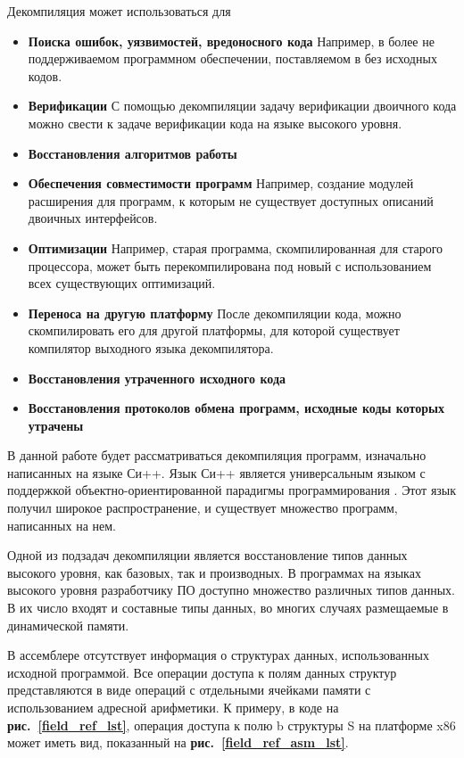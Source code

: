 \documentclass[a4paper,12pt,russian]{article}
\newcommand{\picref}[1]{\textbf{рис.~\ref{#1}}}
\newcommand{\code}[1]{\textsf{#1}}
\begin{document}
Декомпиляция может использоваться для
\begin{itemize}
\item{\textbf{Поиска ошибок, уязвимостей, вредоносного кода}} Например, в более не поддерживаемом программном обеспечении, поставляемом в без исходных кодов.
\item{\textbf{Верификации}} С помощью декомпиляции задачу верификации двоичного кода можно свести к задаче верификации кода на языке высокого уровня.
\item{\textbf{Восстановления алгоритмов работы}}
\item{\textbf{Обеспечения совместимости программ}} Например, создание модулей расширения для программ, к которым не существует доступных описаний двоичных интерфейсов.
\item{\textbf{Оптимизации}} Например, старая программа, скомпилированная для старого процессора, может быть перекомпилирована под новый с использованием всех существующих оптимизаций.
\item{\textbf{Переноса на другую платформу}} После декомпиляции кода, можно скомпилировать его для другой платформы, для которой существует компилятор выходного языка декомпилятора.
\item{\textbf{Восстановления утраченного исходного кода}}
\item{\textbf{Восстановления протоколов обмена программ, исходные коды которых утрачены}}
\end{itemize}

В данной работе будет рассматриваться декомпиляция программ, изначально написанных на языке Си++.
Язык Си++ является универсальным языком с поддержкой объектно-ориентированной парадигмы программирования \cite{strstr}. Этот язык получил широкое распространение, и существует множество программ, написанных на нем.

Одной из подзадач декомпиляции является восстановление типов данных высокого уровня, как базовых, так и производных.
В программах на языках высокого уровня разработчику ПО доступно множество различных типов данных.
В их число входят и составные типы данных, во многих случаях размещаемые в динамической памяти.

В ассемблере отсутствует информация о структурах данных, использованных исходной программой.
Все операции доступа к полям данных структур представляются в виде операций с отдельными ячейками памяти с использованием адресной арифметики.
К примеру, в коде на \picref{field_ref_lst}, операция доступа к полю \code{b} структуры \code{S} на платформе \code{x86} может иметь вид, показанный на \picref{field_ref_asm_lst}.
\end{document}
